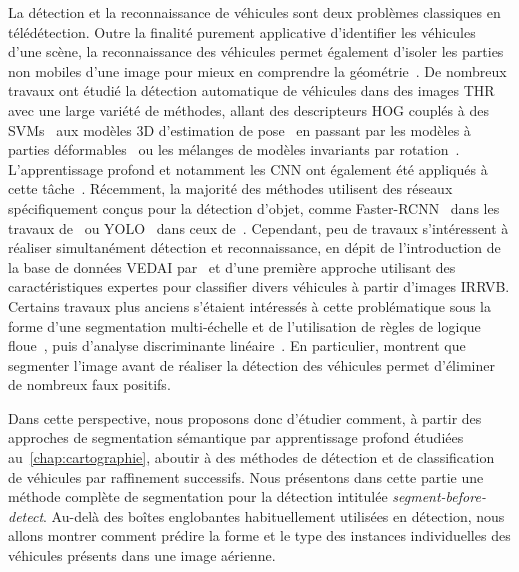 La détection et la reconnaissance de véhicules sont deux problèmes classiques en télédétection. Outre la finalité purement applicative d'identifier les véhicules d'une scène, la reconnaissance des véhicules permet également d'isoler les parties non mobiles d'une image pour mieux en comprendre la géométrie~\cite{leberl_recognizing_2007}. De nombreux travaux ont étudié la détection automatique de véhicules dans des images \gls{THR} avec une large variété de méthodes, allant des descripteurs \gls{HOG} couplés à des \glspl{SVM}~\cite{michel_local_2011,gleason_vehicle_2011,kamenetsky_aerial_2015} aux modèles 3D d'estimation de pose~\cite{janney_pose-invariant_2015} en passant par les modèles à parties déformables~\cite{randrianarivo_urban_2013} ou les mélanges de modèles invariants par rotation~\cite{randrianarivo_contextual_2016}. L'apprentissage profond et notamment les \gls{CNN} ont également été appliqués à cette tâche~\cite{chen_vehicle_2014}. Récemment, la majorité des méthodes utilisent des réseaux spécifiquement conçus pour la détection d'objet, comme Faster-RCNN~\cite{ren_faster_2017} dans les travaux de~\citet{sommer_fast_2017} ou YOLO~\cite{redmon_you_2016} dans ceux de~\citet{van_etten_you_2018}. Cependant, peu de travaux s'intéressent à réaliser simultanément détection et reconnaissance, en dépit de l'introduction de la base de données \gls{VEDAI} par~\citet{razakarivony_vehicle_2016} et d'une première approche utilisant des caractéristiques expertes pour classifier divers véhicules à partir d'images \gls{IRRVB}. Certains travaux plus anciens s'étaient intéressés à cette problématique sous la forme d'une segmentation multi-échelle et de l'utilisation de règles de logique floue~\cite{holt_object-based_2009}, puis d'analyse discriminante linéaire~\cite{eikvil_classification-based_2009}. En particulier, \citet{eikvil_classification-based_2009} montrent que segmenter l'image avant de réaliser la détection des véhicules permet d'éliminer de nombreux faux positifs.

Dans cette perspective, nous proposons donc d'étudier comment, à partir des approches de segmentation sémantique par apprentissage profond étudiées au~\cref{chap:cartographie}, aboutir à des méthodes de détection et de classification de véhicules par raffinement successifs. Nous présentons dans cette partie une méthode complète de segmentation pour la détection intitulée \emph{segment-before-detect}. Au-delà des boîtes englobantes habituellement utilisées en détection, nous allons montrer comment prédire la forme et le type des instances individuelles des véhicules présents dans une image aérienne.

